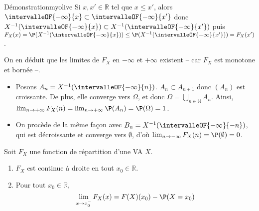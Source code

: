     \begin{demo}{Démonstration}{myolive}
        Si $x,x' \in \mathbb{R}$ tel que $x \leq x'$, alors $\intervalleOF{-\infty}{x} \subset \intervalleOF{-\infty}{x'}$ donc $X^{-1}(\intervalleOF{-\infty}{x}) \subset X^{-1}(\intervalleOF{-\infty}{x'})$ puis $F_X(x) = \P(X^{-1}(\intervalleOF{-\infty}{x})) \leq \P(X^{-1}(\intervalleOF{-\infty}{x'})) = F_X(x')$.

        On en déduit que les limites de $F_X$ en $-\infty$ et $+\infty$ existent -- car $F_X$ est monotone et bornée --. 
        \begin{itemize}
            \item Posons $A_n = X^{-1}(\intervalleOF{-\infty}{n})$. $A_n \subset A_{n+1}$ donc $(A_n)$ est croissante. De plus, elle converge vers $\Omega$, et donc $\Omega = \bigcup_{n \in \mathbb{N}} A_n$. Ainsi, $\lim_{n \to +\infty} F_X(n) = \lim_{n \to +\infty} \P(A_n) = \P(\Omega) = 1$.
            \item On procède de la même façon avec $B_n = X^{-1}(\intervalleOF{-\infty}{-n})$, qui est décroissante et converge vers $\emptyset$, d’où $\lim_{n \to -\infty} F_X(n) = \P(\emptyset) = 0$.
        \end{itemize}
    \end{demo}

    \begin{prop}{}{}
        Soit $F_X$ une fonction de répartition d’une VA $X$. 
        \begin{enumerate}
            \item $F_X$ est continue à droite en tout $x_0 \in \mathbb{R}$.
            \item Pour tout $x_0 \in \mathbb{R}$, 
            \[ \lim_{x \to x_0^-} F_X(x) = F(X)(x_0) - \P(X = x_0) \]   
        \end{enumerate}
    \end{prop}

